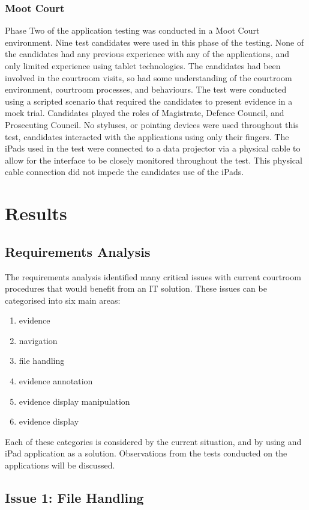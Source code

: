 \documentclass{article}
\begin{document}
\subsubsection{Moot Court}
Phase Two of the application testing was conducted in a Moot Court environment. Nine test candidates were used in this phase of the testing. None of the candidates had any previous experience with any of the applications, and only limited experience using tablet technologies. The candidates had been involved in the courtroom visits, so had some understanding of the courtroom environment, courtroom processes, and behaviours. The test were conducted using a scripted scenario that required the candidates to present evidence in a mock trial. Candidates played the roles of Magistrate, Defence Council, and Prosecuting Council. No styluses, or pointing devices were used throughout this test, candidates interacted with the applications using only their fingers. The iPads used in the test were connected to a data projector via a physical cable to allow for the interface to be closely monitored throughout the test. This physical cable connection did not impede the candidates use of the iPads.

\section{Results}
\subsection{Requirements Analysis}
The requirements analysis identified many critical issues with current courtroom procedures that would benefit from an IT solution. These issues can be categorised into six main areas:
 
\begin{enumerate}
\item evidence 
\item navigation
\item file handling
\item evidence annotation
\item evidence display manipulation
\item evidence display
\end{enumerate}
Each of these categories is considered by the current situation, and by using and iPad application as a solution. Observations from the tests conducted on the applications will be discussed.
 \subsection{Issue 1: File Handling}
\end{document}
